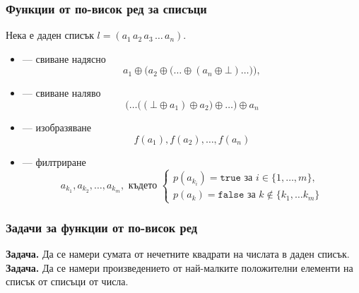 \documentclass[alsotrans,beameroptions={aspectratio=169}]{beamerswitch}
\begin{document}
\begin{frame}
  \frametitle{Функции от по-висок ред за списъци}

  Нека е даден списък $l = (a_1\,a_2\,a_3\,\ldots\,a_n)$.\\
  \begin{itemize}[<+->]
  \item {} --- свиване надясно
    \begin{equation*}
      a_1 \oplus \Big(a_2 \oplus \big(\ldots \oplus (a_n \oplus \bot) \ldots\big)\Big),
    \end{equation*}
  \item {} --- свиване наляво
    \begin{equation*}
      \Big(\ldots\big((\bot \oplus a_1) \oplus a_2\big) \oplus \ldots\Big) \oplus a_n
    \end{equation*}
  \item {} --- изобразяване
    \begin{equation*}
      f(a_1), f(a_2), \ldots, f(a_n)
    \end{equation*}
  \item {} --- филтриране
    \begin{equation*}
      a_{k_1}, a_{k_2}, \ldots, a_{k_m},\text{ където }\left\{
      \begin{array}{l}
        p(a_{k_i})=\mathtt{true}\text{ за }i\in\{1,\ldots,m\},\\
        p(a_k)=\mathtt{false}\text{ за }k\notin\{k_1,\ldots k_m\}
      \end{array}\right.
    \end{equation*}
  \end{itemize}
\end{frame}

\begin{frame}
  \frametitle{Задачи за функции от по-висок ред}

  \textbf{Задача.} Да се намери сумата от нечетните квадрати на числата в даден списък.\\[6ex]
  \pause
  \textbf{Задача.} Да се намери произведението от най-малките положителни елементи на списък от списъци от числа.
\end{frame}
\end{document}
